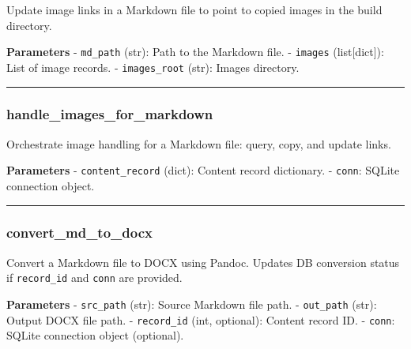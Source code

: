 Update image links in a Markdown file to point to copied images in the
build directory.

\textbf{Parameters} - \texttt{md\_path} (str): Path to the Markdown
file. - \texttt{images} (list{[}dict{]}): List of image records. -
\texttt{images\_root} (str): Images directory.

\begin{center}\rule{0.5\linewidth}{0.5pt}\end{center}

\subsubsection{handle\_images\_for\_markdown}\label{handle_images_for_markdown}

\begin{Shaded}
\begin{Highlighting}[]
\end{Highlighting}
\end{Shaded}

Orchestrate image handling for a Markdown file: query, copy, and update
links.

\textbf{Parameters} - \texttt{content\_record} (dict): Content record
dictionary. - \texttt{conn}: SQLite connection object.

\begin{center}\rule{0.5\linewidth}{0.5pt}\end{center}

\subsubsection{convert\_md\_to\_docx}\label{convert_md_to_docx}

\begin{Shaded}
\begin{Highlighting}[]
\OperatorTok{=}\OperatorTok{=}\NormalTok{)}
\end{Highlighting}
\end{Shaded}

Convert a Markdown file to DOCX using Pandoc. Updates DB conversion
status if \texttt{record\_id} and \texttt{conn} are provided.

\textbf{Parameters} - \texttt{src\_path} (str): Source Markdown file
path. - \texttt{out\_path} (str): Output DOCX file path. -
\texttt{record\_id} (int, optional): Content record ID. - \texttt{conn}:
SQLite connection object (optional).

